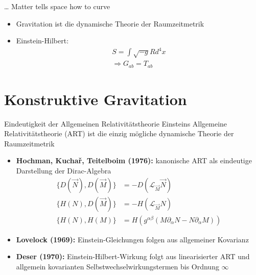 \documentclass{beamer}
\begin{document}
    \begin{frame}{\ldots{} Matter tells space how to curve}
        \begin{itemize}
            \item Gravitation ist die dynamische Theorie der Raumzeitmetrik \pause
            \item Einstein-Hilbert:
            \begin{gather*}
                S = \int \sqrt{-g} R d^4 x \\
                \Rightarrow G_{ab} = T_{ab}
            \end{gather*}
        \end{itemize}
    \end{frame}


    \section{Konstruktive Gravitation}\label{sec:constructive-gravity}

    \begin{frame}{Eindeutigkeit der Allgemeinen Relativitätstheorie}
        Einsteins Allgemeine Relativitätstheorie (ART) ist die einzig mögliche dynamische Theorie
        der Raumzeitmetrik \pause
        \begin{itemize}
            \setlength{\belowdisplayskip}{-10pt}
            \item \textbf{Hochman, Kuchař, Teitelboim (1976):} kanonische ART
            als eindeutige Darstellung der Dirac-Algebra
            \begin{align*}
                \{ D(\vec N), D(\vec M) \} &= -D(\mathcal L_{\vec M} \vec N) \\
                \{ H(N), D(\vec M) \} &= -H(\mathcal L_{\vec M} N) \\
                \{ H(N), H(M) \} &= H(g^{\alpha\beta}(M\partial_\alpha N - N\partial_\alpha M))
            \end{align*} \pause
            \item \textbf{Lovelock (1969):} Einstein-Gleichungen folgen aus allgemeiner Kovarianz \pause
            \item \textbf{Deser (1970):} Einstein-Hilbert-Wirkung folgt aus linearisierter ART und allgemein kovarianten
            Selbstwechselwirkungstermen bis Ordnung $\infty$
        \end{itemize}
    \end{frame}
\end{document}
